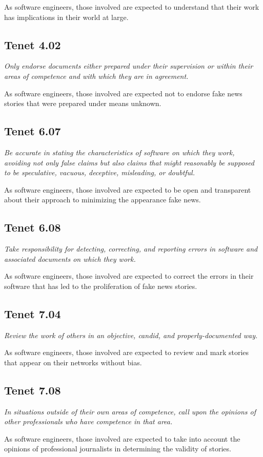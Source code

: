 As software engineers, those involved are expected to understand that their work has implications in their world at large.

\subsection{Tenet 4.02}

\emph{Only endorse documents either prepared under their supervision or within their areas of competence and with which they are in agreement. \cite{se_code}}

As software engineers, those involved are expected not to endorse fake news stories that were prepared under means unknown.

\subsection{Tenet 6.07}

\emph{Be accurate in stating the characteristics of software on which they work, avoiding not only false claims but also claims that might reasonably be supposed to be speculative, vacuous, deceptive, misleading, or doubtful. \cite{se_code}}

As software engineers, those involved are expected to be open and transparent about their approach to minimizing the appearance fake news.

\subsection{Tenet 6.08}

\emph{Take responsibility for detecting, correcting, and reporting errors in software and associated documents on which they work. \cite{se_code}}

As software engineers, those involved are expected to correct the errors in their software that has led to the proliferation of fake news stories.

\subsection{Tenet 7.04}

\emph{Review the work of others in an objective, candid, and properly-documented way. \cite{se_code}}

As software engineers, those involved are expected to review and mark stories that appear on their networks without bias.

\subsection{Tenet 7.08}

\emph{In situations outside of their own areas of competence, call upon the opinions of other professionals who have competence in that area. \cite{se_code}}

As software engineers, those involved are expected to take into account the opinions of professional journalists in determining the validity of stories. 